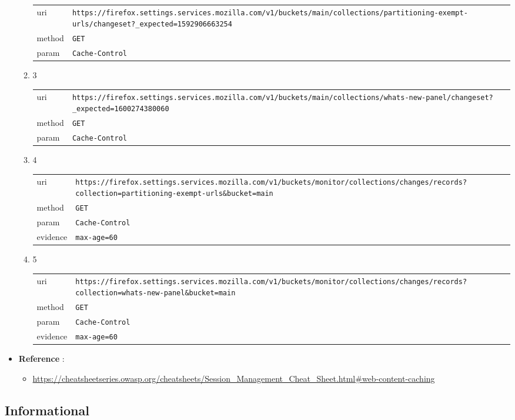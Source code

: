 \documentclass[10pt]{article}
\begin{document}
\begin{itemize}
\begin{enumerate}
\begin{tabular}{| l | p{12cm}}
uri & \texttt{https://firefox.settings.services.mozilla.com/v1/buckets/main/collections/partitioning-exempt-urls/changeset?\_expected=1592906663254} \\
method & \texttt{GET} \\
param & \texttt{Cache-Control} \\
\end{tabular}
\item[] 3
\begin{tabular}{| l | p{12cm}}
uri & \texttt{https://firefox.settings.services.mozilla.com/v1/buckets/main/collections/whats-new-panel/changeset?\_expected=1600274380060} \\
method & \texttt{GET} \\
param & \texttt{Cache-Control} \\
\end{tabular}
\item[] 4
\begin{tabular}{| l | p{12cm}}
uri & \texttt{https://firefox.settings.services.mozilla.com/v1/buckets/monitor/collections/changes/records?collection=partitioning-exempt-urls\&bucket=main} \\
method & \texttt{GET} \\
param & \texttt{Cache-Control} \\
evidence & \texttt{max-age=60} \\
\end{tabular}
\item[] 5
\begin{tabular}{| l | p{12cm}}
uri & \texttt{https://firefox.settings.services.mozilla.com/v1/buckets/monitor/collections/changes/records?collection=whats-new-panel\&bucket=main} \\
method & \texttt{GET} \\
param & \texttt{Cache-Control} \\
evidence & \texttt{max-age=60} \\
\end{tabular}
\end{enumerate}
\item[] \textbf{Reference} : 
\begin{itemize}
\item \url{https://cheatsheetseries.owasp.org/cheatsheets/Session\_Management\_Cheat\_Sheet.html\#web-content-caching}
\end{itemize}
\end{itemize}
\subsection{Informational}
\end{document}
